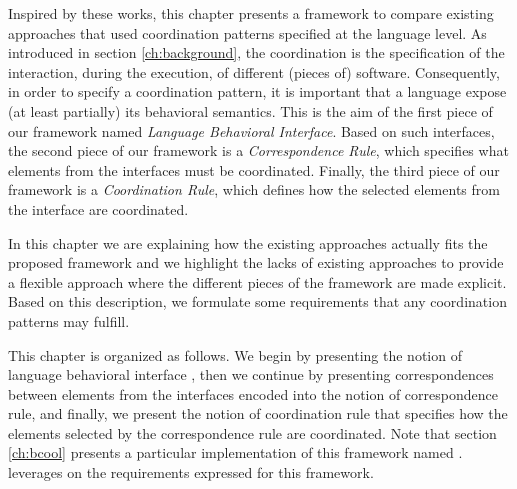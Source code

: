 Inspired by these works, this chapter presents a framework to compare existing approaches that used coordination patterns specified at the language level. As introduced in section \ref{ch:background}, the coordination is the specification of the interaction, during the execution, of different (pieces of) software. Consequently, in order to specify a coordination pattern, it is important that a language expose (at least partially) its behavioral semantics. This is the aim of the first piece of our framework named \emph{Language Behavioral Interface}. Based on such interfaces, the second piece of our framework is a \emph{Correspondence Rule}, which specifies what elements from the interfaces must be coordinated. Finally, the third piece of our framework is a \emph{Coordination Rule}, which defines how the selected elements from the interface are coordinated.


In this chapter we are explaining how the existing approaches actually fits the proposed framework and we highlight the lacks of existing approaches to provide a flexible approach where the different pieces of the framework are made explicit. Based on this description, we formulate some requirements that any coordination patterns may fulfill.

This chapter is organized as follows. We begin by presenting the notion of language behavioral interface
, then we continue by presenting correspondences between elements from the interfaces encoded into the notion of correspondence rule, and finally, we present the notion of coordination rule that specifies how the elements selected by the correspondence rule are coordinated. 
Note that section \ref{ch:bcool} presents a particular implementation of this framework named \bcool. \bcool leverages on the requirements expressed for this framework.

